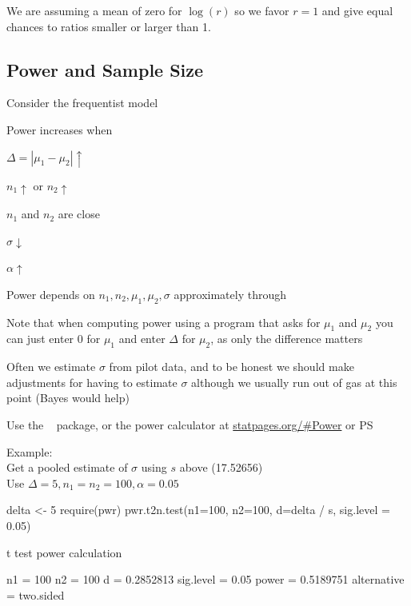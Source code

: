 \ei

We are assuming a mean of zero for $\log(r)$ so we favor $r=1$ and give equal chances to ratios smaller or larger than 1.
\subsection{Power and Sample Size}
\bi
\item Consider the frequentist model
\item Power increases when
 \bi
 \item $\Delta = |\mu_{1}-\mu_{2}| \uparrow$
 \item $n_{1} \uparrow$ or $n_{2} \uparrow$
 \item $n_{1}$ and $n_{2}$ are close
 \item $\sigma \downarrow$
 \item $\alpha \uparrow$
 \ei
\item Power depends on $n_{1}, n_{2}, \mu_{1}, \mu_{2}, \sigma$
  approximately through 
\beq
{}
\eeq
\item Note that when computing power using a program that asks for
  $\mu_{1}$ and $\mu_{2}$ you can just enter 0 for $\mu_{1}$ and enter
  $\Delta$ for $\mu_{2}$, as only the difference matters
\item Often we estimate $\sigma$ from pilot data, and to be honest we
  should make adjustments for having to estimate $\sigma$ although we
  usually run out of gas at this point (Bayes would help)
\item Use the \R\  package, or the power calculator at
  \url{statpages.org/#Power} or PS 
\item Example: \\
 Get a pooled estimate of $\sigma$ using $s$ above (17.52656) \\
 Use $\Delta=5, n_{1}=n_{2}=100, \alpha=0.05$
\begin{Schunk}
\begin{Sinput}
delta <- 5
require(pwr)
pwr.t2n.test(n1=100, n2=100, d=delta / s, sig.level = 0.05)
\end{Sinput}
\begin{Soutput}

     t test power calculation 

             n1 = 100
             n2 = 100
              d = 0.2852813
      sig.level = 0.05
          power = 0.5189751
    alternative = two.sided
\end{Soutput}
\end{Schunk}
